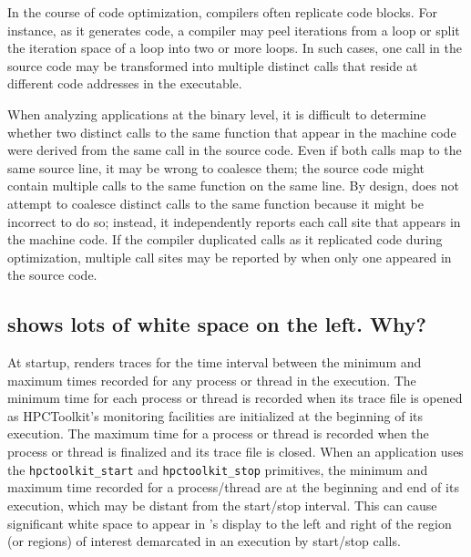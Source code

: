 \documentclass[11pt,twoside,letterpaper]{report}
\begin{document}
In the course of code optimization, compilers often replicate code blocks.
For instance, as it generates code, a compiler may peel iterations from a loop or split the iteration space of a loop into two or more loops.
In such cases, one call in the source code may be transformed into multiple distinct calls that reside at different code addresses in the executable.

When analyzing applications at the binary level, it is difficult to determine whether two distinct calls to the same function that appear in the machine code were derived from the same call in the source code.
Even if both calls map to the same source line, it may be wrong to coalesce them; the source code might contain multiple calls to the same function on the same line.
By design, \HPCToolkit{} does not attempt to coalesce distinct calls to the same function because it might be incorrect to do so; instead, it independently reports each call site that appears in the machine code.
If the compiler duplicated calls as it replicated code during optimization, multiple call sites may be reported by \hpcviewer{} when only one appeared in the source code.


\subsection{\hpctraceviewer{} shows lots of white space on the left. Why?}

At startup, \hpctraceviewer{}  renders traces for the time interval between the minimum and maximum times recorded for any process or thread in the execution. The minimum time for each process or thread is recorded when its trace file is opened as HPCToolkit's monitoring facilities are initialized at the beginning of its execution. The maximum time for a process or thread is recorded when the process or thread is finalized and its trace file is closed. When an application uses the \verb|hpctoolkit_start| and \verb|hpctoolkit_stop| primitives, the minimum and maximum time recorded for a process/thread are  at the beginning and end of its execution, which may be  distant from the start/stop interval. This can cause significant white space to appear in \hpctraceviewer{}'s display to the left and right of the region (or regions) of interest demarcated in an execution by start/stop calls.
\end{document}
